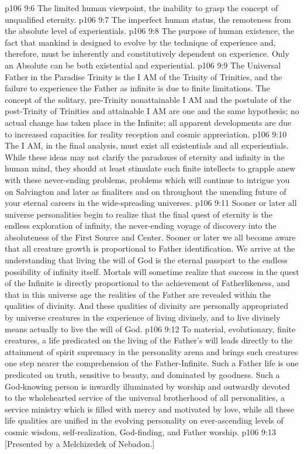 \vs p106 9:6 \bibnobreakspace The limited human viewpoint, the inability to grasp the concept of unqualified eternity.
\vs p106 9:7 \bibnobreakspace The imperfect human status, the remoteness from the absolute level of experientials.
\vs p106 9:8 \bibnobreakspace The purpose of human existence, the fact that mankind is designed to evolve by the technique of experience and, therefore, must be inherently and constitutively dependent on experience. Only an Absolute can be both existential and experiential.
\vs p106 9:9 \pc The Universal Father in the Paradise Trinity is the I AM of the Trinity of Trinities, and the failure to experience the Father as infinite is due to finite limitations. The concept of the  solitary, pre\hyp{}Trinity nonattainable I AM and the postulate of the  post\hyp{}Trinity of Trinities and attainable I AM are one and the same hypothesis; no actual change has taken place in the Infinite; all apparent developments are due to increased capacities for reality reception and cosmic appreciation.
\vs p106 9:10 The I AM, in the final analysis, must exist  all existentials and  all experientials. While these ideas may not clarify the paradoxes of eternity and infinity in the human mind, they should at least stimulate such finite intellects to grapple anew with these never\hyp{}ending problems, problems which will continue to intrigue you on Salvington and later as finaliters and on throughout the unending future of your eternal careers in the wide\hyp{}spreading universes.
\vs p106 9:11 \pc Sooner or later all universe personalities begin to realize that the final quest of eternity is the endless exploration of infinity, the never\hyp{}ending voyage of discovery into the absoluteness of the First Source and Center. Sooner or later we all become aware that all creature growth is proportional to Father identification. We arrive at the understanding that living the will of God is the eternal passport to the endless possibility of infinity itself. Mortals will sometime realize that success in the quest of the Infinite is directly proportional to the achievement of Fatherlikeness, and that in this universe age the realities of the Father are revealed within the qualities of divinity. And these qualities of divinity are personally appropriated by universe creatures in the experience of living divinely, and to live divinely means actually to live the will of God.
\vs p106 9:12 To material, evolutionary, finite creatures, a life predicated on the living of the Father’s will leads directly to the attainment of spirit supremacy in the personality arena and brings such creatures one step nearer the comprehension of the Father\hyp{}Infinite. Such a Father life is one predicated on truth, sensitive to beauty, and dominated by goodness. Such a God\hyp{}knowing person is inwardly illuminated by worship and outwardly devoted to the wholehearted service of the universal brotherhood of all personalities, a service ministry which is filled with mercy and motivated by love, while all these life qualities are unified in the evolving personality on ever\hyp{}ascending levels of cosmic wisdom, self\hyp{}realization, God\hyp{}finding, and Father worship.
\vsetoff
\vs p106 9:13 [Presented by a Melchizedek of Nebadon.]
